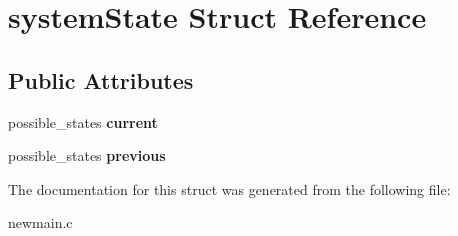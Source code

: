 \hypertarget{structsystem_state}{\section{system\+State Struct Reference}
\label{structsystem_state}
}
\subsection*{Public Attributes}
\begin{DoxyCompactItemize}
\item 
\hypertarget{structsystem_state_a10d8d5ad43c144ea84622edc6828a856}{possible\+\_\+states {\bfseries current}}\label{structsystem_state_a10d8d5ad43c144ea84622edc6828a856}

\item 
\hypertarget{structsystem_state_a9bb9b5d5911a53ecb253c7ba941edffc}{possible\+\_\+states {\bfseries previous}}\label{structsystem_state_a9bb9b5d5911a53ecb253c7ba941edffc}

\end{DoxyCompactItemize}


The documentation for this struct was generated from the following file\+:\begin{DoxyCompactItemize}
\item 
newmain.\+c\end{DoxyCompactItemize}
